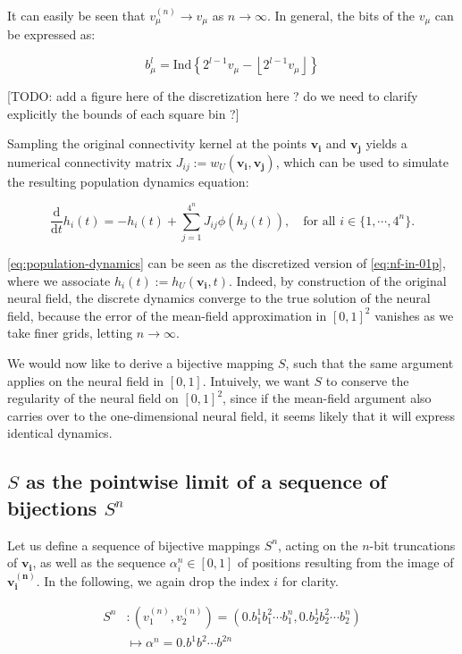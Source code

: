 \documentclass[10pt,letterpaper]{article}
\def\d{\mathrm d}
\renewcommand{\vec}[1]{\boldsymbol{#1}}
\begin{document}
It can easily be seen that $v_\mu^{(n)} \to v_\mu$ as $n\to\infty$. In general, the bits of the $v_\mu$ can be expressed as:

\begin{equation*}
b_\mu^l = \mathrm{Ind} \left\{ 2^{l-1}v_\mu - \left\lfloor 2^{l-1}v_\mu \right\rfloor \right\}
\end{equation*}

[TODO: add a figure here of the discretization here ? do we need to clarify explicitly the bounds of each square bin ?]

Sampling the original connectivity kernel at the points $\vec{v_i}$ and $\vec{v_j}$ yields a numerical connectivity matrix $J_{ij} := w_U(\vec{v_i}, \vec{v_j})$, which can be used to simulate the resulting population dynamics equation:

\begin{equation} \label{eq:population-dynamics}
\frac{\d}{\d t} h_i(t) = -h_i(t) + \sum_{j=1}^{4^n} J_{ij} \phi(h_j(t)), \quad \text{for all } i \in \{1,\cdots,4^n\}.
\end{equation}

\autoref{eq:population-dynamics} can be seen as the discretized version of \autoref{eq:nf-in-01p}, where we associate $h_i(t) := h_U(\vec{v_i}, t)$. Indeed, by construction of the original neural field, the discrete dynamics converge to the true solution of the neural field, because the error of the mean-field approximation in $[0,1]^2$ vanishes as we take finer grids, letting $n \to \infty$.

We would now like to derive a bijective mapping $S$, such that the same argument applies on the neural field in $[0,1]$. Intuively, we want $S$ to conserve the regularity of the neural field on $[0,1]^2$, since if the mean-field argument also carries over to the one-dimensional neural field, it seems likely that it will express identical dynamics.

\subsection{$S$ as the pointwise limit of a sequence of bijections $S^n$}

Let us define a sequence of bijective mappings $S^n$, acting on the $n$-bit truncations of $\vec{v_i}$, as well as the sequence $\alpha_i^n \in [0,1]$ of positions resulting from the image of $\vec{v_i^{(n)}}$. In the following, we again drop the index $i$ for clarity.

\begin{equation} \begin{aligned}
S^n &: (v_1^{(n)}, v_2^{(n)}) = (0.b_1^1 b_1^2 \cdots b_1^n, 0.b_2^1 b_2^2 \cdots b_2^n) \\
&\mapsto \alpha^n = 0.b^1 b^2 \cdots b^{2n}
\end{aligned} \end{equation}
\end{document}
